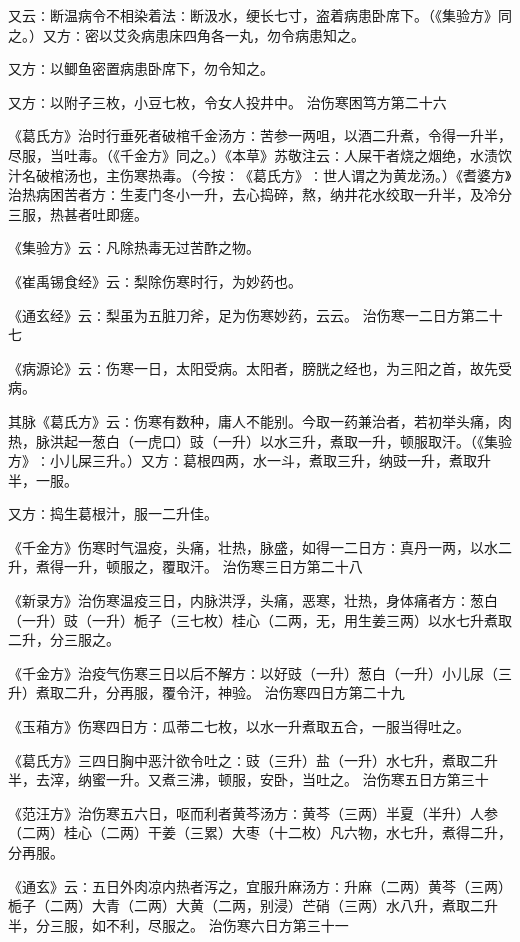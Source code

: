 \documentclass[a4paper,12pt,UTF8,twoside]{ctexbook}
\begin{document}
又云∶断温病令不相染着法∶断汲水，绠长七寸，盗着病患卧席下。（《集验方》同之。）又方∶密以艾灸病患床四角各一丸，勿令病患知之。

又方∶以鲫鱼密置病患卧席下，勿令知之。

又方∶以附子三枚，小豆七枚，令女人投井中。
治伤寒困笃方第二十六

《葛氏方》治时行垂死者破棺千金汤方∶苦参一两咀，以酒二升煮，令得一升半，尽服，当吐毒。（《千金方》同之。）《本草》苏敬注云∶人屎干者烧之烟绝，水渍饮汁名破棺汤也，主伤寒热毒。（今按∶《葛氏方》∶世人谓之为黄龙汤。）《耆婆方》治热病困苦者方∶生麦门冬小一升，去心捣碎，熬，纳井花水绞取一升半，及冷分三服，热甚者吐即瘥。

《集验方》云∶凡除热毒无过苦酢之物。

《崔禹锡食经》云∶梨除伤寒时行，为妙药也。

《通玄经》云∶梨虽为五脏刀斧，足为伤寒妙药，云云。
治伤寒一二日方第二十七

《病源论》云∶伤寒一日，太阳受病。太阳者，膀胱之经也，为三阳之首，故先受病。

其脉《葛氏方》云∶伤寒有数种，庸人不能别。今取一药兼治者，若初举头痛，肉热，脉洪起一葱白（一虎口）豉（一升）以水三升，煮取一升，顿服取汗。（《集验方》∶小儿屎三升。）又方∶葛根四两，水一斗，煮取三升，纳豉一升，煮取升半，一服。

又方∶捣生葛根汁，服一二升佳。

《千金方》伤寒时气温疫，头痛，壮热，脉盛，如得一二日方∶真丹一两，以水二升，煮得一升，顿服之，覆取汗。
治伤寒三日方第二十八

《新录方》治伤寒温疫三日，内脉洪浮，头痛，恶寒，壮热，身体痛者方∶葱白（一升）豉（一升）栀子（三七枚）桂心（二两，无，用生姜三两）以水七升煮取二升，分三服之。

《千金方》治疫气伤寒三日以后不解方∶以好豉（一升）葱白（一升）小儿尿（三升）煮取二升，分再服，覆令汗，神验。
治伤寒四日方第二十九

《玉葙方》伤寒四日方∶瓜蒂二七枚，以水一升煮取五合，一服当得吐之。

《葛氏方》三四日胸中恶汁欲令吐之∶豉（三升）盐（一升）水七升，煮取二升半，去滓，纳蜜一升。又煮三沸，顿服，安卧，当吐之。
治伤寒五日方第三十

《范汪方》治伤寒五六日，呕而利者黄芩汤方∶黄芩（三两）半夏（半升）人参（二两）桂心（二两）干姜（三累）大枣（十二枚）凡六物，水七升，煮得二升，分再服。

《通玄》云∶五日外肉凉内热者泻之，宜服升麻汤方∶升麻（二两）黄芩（三两）栀子（二两）大青（二两）大黄（二两，别浸）芒硝（三两）水八升，煮取二升半，分三服，如不利，尽服之。
治伤寒六日方第三十一
\end{document}
